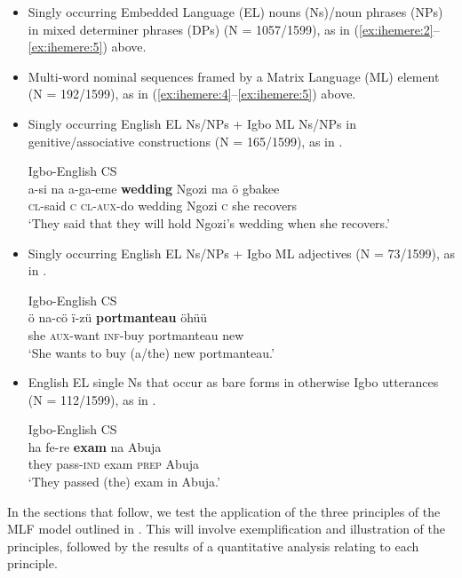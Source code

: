 \documentclass[output=paper]{langsci/langscibook}
\begin{document}
\begin{itemize}[noitemsep]
 \item Singly occurring Embedded Language (EL) nouns (Ns)/noun phrases (NPs) in mixed determiner phrases (DPs) (N = 1057/1599), as in (\ref{ex:ihemere:2}--\ref{ex:ihemere:5}) above. 

 \item Multi-word nominal sequences framed by a Matrix Language (ML) element (N = 192/1599), as in (\ref{ex:ihemere:4}--\ref{ex:ihemere:5}) above.

 \item Singly occurring English EL Ns/NPs + Igbo ML Ns/NPs in genitive/associative constructions (N = 165/1599), as in .
 
\ea\label{ex:ihemere:6}
{Igbo-English \textsc{CS}}\\
\gll a-si    na  a-ga-eme   \textbf{wedding}  Ngozi  ma   ö  gbakee\\
     \textsc{cl}-said  \textsc{c}  \textsc{cl-aux}-do  wedding  Ngozi  \textsc{c}  she  recovers\\
\glt ‘They said that they will hold Ngozi’s wedding when she recovers.’
\z

\item Singly occurring English EL Ns/NPs + Igbo ML adjectives (N = 73/1599), as in .
 

\ea\label{ex:ihemere:7}
{Igbo-English \textsc{CS}}\\
\gll ö  na-cö    ï-zü    \textbf{portmanteau}  öhüü \\
     she  \textsc{aux}-want  \textsc{inf}-buy  portmanteau  new\\
\glt ‘She wants to buy (a/the) new portmanteau.’
\z
\item English EL single Ns that occur as bare forms in otherwise Igbo utterances (N = 112/1599), as in .


\ea\label{ex:ihemere:8}
{Igbo-English \textsc{CS}}\\
\gll ha    fe-re    \textbf{exam}  na   Abuja\\
     they  pass-\textsc{ind}  exam  \textsc{prep}  Abuja \\
\glt ‘They passed (the) exam in Abuja.’
\z

\end{itemize}

In the sections that follow, we test the application of the three principles of the MLF model outlined in . This will involve exemplification and illustration of the principles, followed by the results of a quantitative analysis relating to each principle. 
\end{document}
